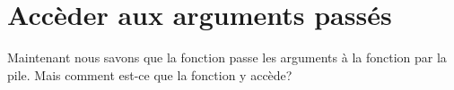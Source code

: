 \section{Accèder aux arguments passés} %
\myindex{\Stack}

Maintenant nous savons que la fonction  passe les arguments
à la fonction  par la pile.
Mais comment est-ce que la fonction  y accède?









